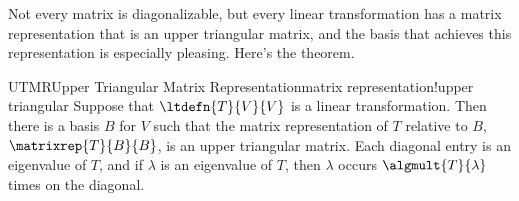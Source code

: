 




%
%
Not every matrix is diagonalizable, but every linear transformation has a matrix representation that is an upper triangular matrix, and the basis that achieves this representation is especially pleasing.  Here's the theorem.
%
\begin{theorem}{UTMR}{Upper Triangular Matrix Representation}{matrix representation!upper triangular}
Suppose that $\ltdefn{T}{V}{V}$ is a linear transformation.  Then there is a basis $B$ for $V$ such that the matrix representation of $T$ relative to $B$, $\matrixrep{T}{B}{B}$, is an upper triangular matrix.  Each diagonal entry is an eigenvalue of $T$, and if $\lambda$ is an eigenvalue of $T$, then $\lambda$ occurs $\algmult{T}{\lambda}$ times on the diagonal.
\end{theorem}
%
